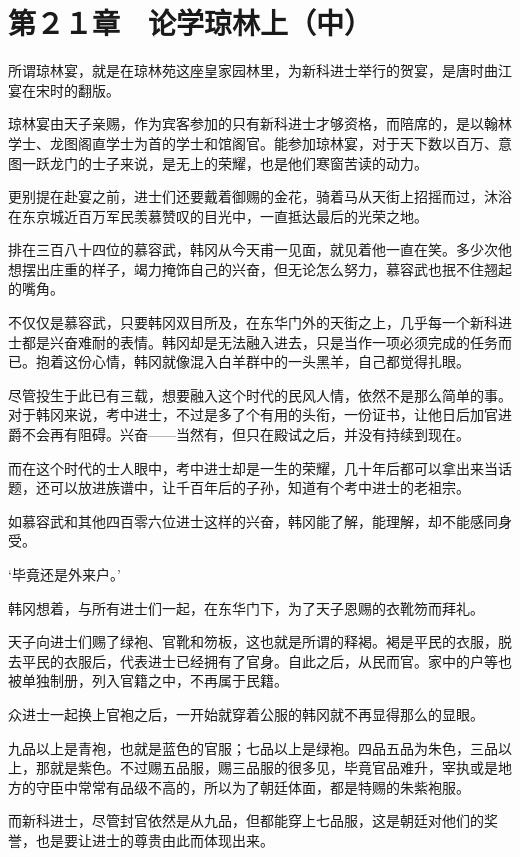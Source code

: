 \section{第２１章　论学琼林上（中）}

所谓琼林宴，就是在琼林苑这座皇家园林里，为新科进士举行的贺宴，是唐时曲江宴在宋时的翻版。

琼林宴由天子亲赐，作为宾客参加的只有新科进士才够资格，而陪席的，是以翰林学士、龙图阁直学士为首的学士和馆阁官。能参加琼林宴，对于天下数以百万、意图一跃龙门的士子来说，是无上的荣耀，也是他们寒窗苦读的动力。

更别提在赴宴之前，进士们还要戴着御赐的金花，骑着马从天街上招摇而过，沐浴在东京城近百万军民羡慕赞叹的目光中，一直抵达最后的光荣之地。

排在三百八十四位的慕容武，韩冈从今天甫一见面，就见着他一直在笑。多少次他想摆出庄重的样子，竭力掩饰自己的兴奋，但无论怎么努力，慕容武也抿不住翘起的嘴角。

不仅仅是慕容武，只要韩冈双目所及，在东华门外的天街之上，几乎每一个新科进士都是兴奋难耐的表情。韩冈却是无法融入进去，只是当作一项必须完成的任务而已。抱着这份心情，韩冈就像混入白羊群中的一头黑羊，自己都觉得扎眼。

尽管投生于此已有三载，想要融入这个时代的民风人情，依然不是那么简单的事。对于韩冈来说，考中进士，不过是多了个有用的头衔，一份证书，让他日后加官进爵不会再有阻碍。兴奋——当然有，但只在殿试之后，并没有持续到现在。

而在这个时代的士人眼中，考中进士却是一生的荣耀，几十年后都可以拿出来当话题，还可以放进族谱中，让千百年后的子孙，知道有个考中进士的老祖宗。

如慕容武和其他四百零六位进士这样的兴奋，韩冈能了解，能理解，却不能感同身受。

‘毕竟还是外来户。’

韩冈想着，与所有进士们一起，在东华门下，为了天子恩赐的衣靴笏而拜礼。

天子向进士们赐了绿袍、官靴和笏板，这也就是所谓的释褐。褐是平民的衣服，脱去平民的衣服后，代表进士已经拥有了官身。自此之后，从民而官。家中的户等也被单独制册，列入官籍之中，不再属于民籍。

众进士一起换上官袍之后，一开始就穿着公服的韩冈就不再显得那么的显眼。

九品以上是青袍，也就是蓝色的官服；七品以上是绿袍。四品五品为朱色，三品以上，那就是紫色。不过赐五品服，赐三品服的很多见，毕竟官品难升，宰执或是地方的守臣中常常有品级不高的，所以为了朝廷体面，都是特赐的朱紫袍服。

而新科进士，尽管封官依然是从九品，但都能穿上七品服，这是朝廷对他们的奖誉，也是要让进士的尊贵由此而体现出来。

